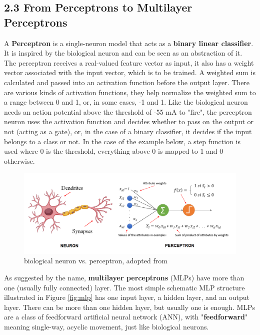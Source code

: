 \documentclass[nobib]{tufte-handout}
\begin{document}
\subsection{2.3 \textbf{From Perceptrons to Multilayer Perceptrons}}

A \textbf{Perceptron} is a single-neuron model that acts as a \textbf{binary linear classifier}. It is inspired by the biological neuron and can be seen as an abstraction of it. The perceptron receives a real-valued feature vector as input, it also has a weight vector associated with the input vector, which is to be trained. A weighted sum is calculated and passed into an activation function before the output layer. There are various kinds of activation functions, they help normalize the weighted sum to a range between 0 and 1, or, in some cases, -1 and 1. Like the biological neuron needs an action potential above the threshold of -55 mA to "fire", the perceptron neuron uses the activation function and decides whether to pass on the output or not (acting as a gate), or, in the case of a binary classifier, it decides if the input belongs to a class or not. In the case of the example below, a step function is used where 0 is the threshold, everything above 0 is mapped to 1 and 0 otherwise. \\
\begin{figure}[h!]
  \centering
  \includegraphics{perceptron1.png}
  \caption{biological neuron vs. perceptron, adopted from \cite{IF:perceptron}}
\end{figure}
As suggested by the name, \textbf{multilayer perceptrons} (MLPs) have more than one (usually fully connected) layer. The most simple schematic MLP structure illustrated in Figure \ref{fig:mlp} has one input layer, a hidden layer, and an output layer. There can be more than one hidden layer, but usually one is enough. MLPs are a class of feedforward artificial neural network (ANN), with "\textbf{feedforward}" meaning single-way, acyclic movement, just like biological neurons.\\ 
\end{document}
